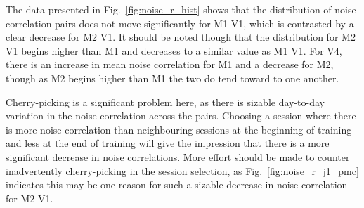 The data presented in Fig.~\ref{fig:noise_r_hist} shows that the distribution of noise correlation pairs does not move significantly for \ac{M1} \ac{V1}, which is contrasted by a clear decrease for \ac{M2} \ac{V1}.
It should be noted though that the distribution for \ac{M2} \ac{V1} begins higher than \ac{M1} and decreases to a similar value as \ac{M1} \ac{V1}.
For \ac{V4}, there is an increase in mean noise correlation for \ac{M1} and a decrease for \ac{M2}, though as \ac{M2} begins higher than \ac{M1} the two do tend toward to one another.

Cherry-picking is a significant problem here, as there is sizable day-to-day variation in the noise correlation across the pairs.
Choosing a session where there is more noise correlation than neighbouring sessions at the beginning of training and less at the end of training will give the impression that there is a more significant decrease in noise correlations.
More effort should be made to counter inadvertently cherry-picking in the session selection, as Fig.~\ref{fig:noise_r_j1_pmc} indicates this may be one reason for such a sizable decrease in noise correlation for \ac{M2} \ac{V1}.

